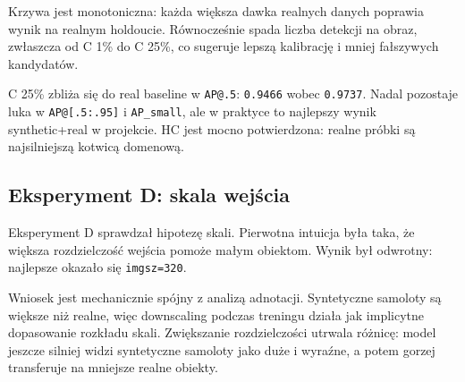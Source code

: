 \documentclass[
  11pt,
]{article}
\begin{document}
Krzywa jest monotoniczna: każda większa dawka realnych danych poprawia
wynik na realnym holdoucie. Równocześnie spada liczba detekcji na obraz,
zwłaszcza od C 1\% do C 25\%, co sugeruje lepszą kalibrację i mniej
fałszywych kandydatów.

C 25\% zbliża się do real baseline w \texttt{AP@.5}: \texttt{0.9466}
wobec \texttt{0.9737}. Nadal pozostaje luka w \texttt{AP@{[}.5:.95{]}} i
\texttt{AP\_small}, ale w praktyce to najlepszy wynik synthetic+real w
projekcie. HC jest mocno potwierdzona: realne próbki są najsilniejszą
kotwicą domenową.

\hypertarget{eksperyment-d-skala-wejux15bcia}{%
\subsection{Eksperyment D: skala
wejścia}\label{eksperyment-d-skala-wejux15bcia}}

Eksperyment D sprawdzał hipotezę skali. Pierwotna intuicja była taka, że
większa rozdzielczość wejścia pomoże małym obiektom. Wynik był odwrotny:
najlepsze okazało się \texttt{imgsz=320}.

\begingroup
{}
\noindent{}
\endgroup


Wniosek jest mechanicznie spójny z analizą adnotacji. Syntetyczne
samoloty są większe niż realne, więc downscaling podczas treningu działa
jak implicytne dopasowanie rozkładu skali. Zwiększanie rozdzielczości
utrwala różnicę: model jeszcze silniej widzi syntetyczne samoloty jako
duże i wyraźne, a potem gorzej transferuje na mniejsze realne obiekty.
\end{document}
